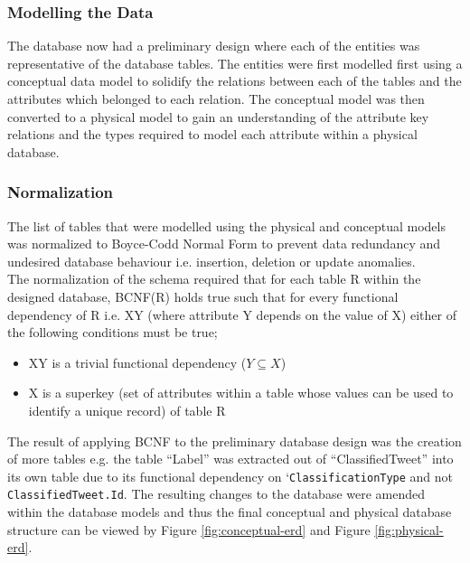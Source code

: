 \documentclass[11pt]{report}
\begin{document}
\subsubsection*{Modelling the Data}
The database now had a preliminary design where each of the entities was representative of the database tables. The entities were first modelled first using a conceptual data model to solidify the relations between each of the tables and the attributes which belonged to each relation. The conceptual model was then converted to a physical model to gain an understanding of the attribute key relations and the types required to model each attribute within a physical database.

\subsubsection*{Normalization}
The list of tables that were modelled using the physical and conceptual models was normalized to Boyce-Codd Normal Form \citep*{CoddRecentInvestigationsRelational1974} to prevent data redundancy and undesired database behaviour i.e. insertion, deletion or update anomalies.
\\

The normalization of the schema required that for each table R within the designed database, BCNF(R) holds true such that for every functional dependency of R i.e. X\textrightarrow Y (where attribute Y depends on the value of X) either of the following conditions must be true;

\begin{itemize}
\item X\textrightarrow Y is a trivial functional dependency ($Y  \subseteq X$) 
\item X is a superkey (set of attributes within a table whose values can be used to identify a unique record) of table R
\end{itemize}

The result of applying BCNF to the preliminary database design was the creation of more tables e.g. the table ``Label'' was extracted out of ``Classified\textunderscore Tweet'' into its own table due to its functional dependency on `\texttt{Classification\textunderscore Type} and not \texttt{Classified\textunderscore Tweet.Id}. The resulting changes to the database were amended within the database models and thus the final conceptual and physical database structure can be viewed by Figure \ref{fig:conceptual-erd} and Figure \ref{fig:physical-erd}.
\end{document}

